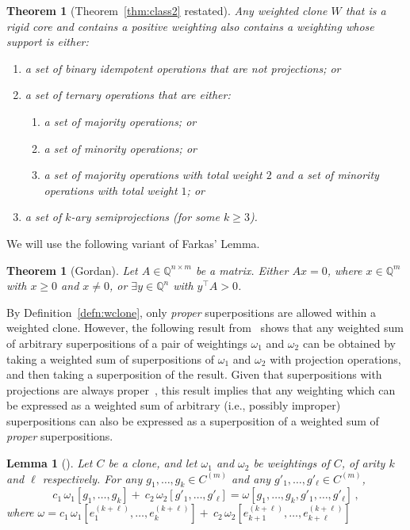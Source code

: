 \documentclass[11pt, reqno]{article}
\newtheorem{theorem}{Theorem}%
\newtheorem{lemma}{Lemma} %
\newtheorem*{theorem*}{Theorem}
\theoremstyle{remark}
\begin{document}
\begin{theorem*}[Theorem~\ref{thm:class2} restated]
%
Any weighted clone $W$ that is a rigid core and contains a positive weighting
also contains a weighting whose support is either:
\begin{enumerate}
  \item a set of binary idempotent operations that are not projections; or
  \item a set of ternary operations that are either:
  \begin{enumerate}
   \item a set of majority operations; or 
   \item a set of minority operations; or 
  \item  a set of majority operations with total weight $2$ and a set
  of minority operations with total weight $1$; or 
  \end{enumerate}
  \item a set of $k$-ary semiprojections (for some $k \geq 3$).
\end{enumerate}
%
\end{theorem*}

We will use the following variant of Farkas' Lemma.
%
\begin{theorem}[Gordan]\label{thm:gordan}
Let $A\in\mathbb{Q}^{n\times m}$ be a matrix. 
Either $Ax=0$, where $x\in\mathbb{Q}^{m}$ with $x\geq 0$
and $x\neq 0$, or $\exists y\in\mathbb{Q}^n$ with $y^{\intercal}A>0$.
\end{theorem}

By Definition~\ref{defn:wclone}, only \emph{proper} superpositions are allowed
within a weighted clone. However, the following result
from~\cite{cccjz13:sicomp} shows that any weighted sum of arbitrary
superpositions of a pair of weightings $\omega_1$ and $\omega_2$ can be obtained
by taking a weighted sum of superpositions of $\omega_1$ and $\omega_2$ with
projection operations, and then taking a superposition of the result. Given that
superpositions with projections are always proper~\cite{cccjz13:sicomp}, this
result implies that any weighting which can be expressed as a weighted sum of
arbitrary (i.e., possibly improper) superpositions can also be expressed as a superposition of a weighted
sum of \emph{proper} superpositions.

\begin{lemma}[]
\label{lemma:sumofsuperpos}
Let $C$ be a clone, and let $\omega_1$ and $\omega_2$ be weightings of $C$, of arity $k$ and $\ell$ respectively.
For any $g_1,\ldots,g_k \in C^{(m)}$ and any $g'_1,\ldots,g'_\ell \in C^{(m)}$,
\begin{equation*}
c_1 \, \omega_1[g_1,\ldots,g_k] + \ c_2 \, \omega_2[g'_1,\ldots,g'_{\ell}] =
\omega[g_1,\ldots,g_k,g'_1,\ldots,g'_{\ell}]\,,
\end{equation*}
where $\omega = c_1 \, \omega_1[e^{(k+\ell)}_1,\ldots,e^{(k+\ell)}_k] + \ c_2 \, \omega_2[e^{(k+\ell)}_{k+1},\ldots,e^{(k+\ell)}_{k+\ell}]$
\end{lemma}
\end{document}
